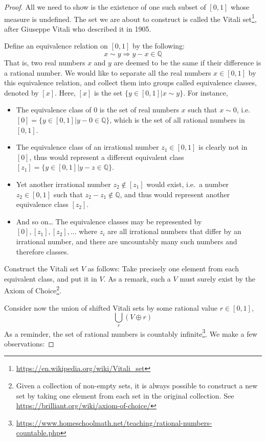 \documentclass[
]{book}
\newcommand{\bbQ}{\mathbb{Q}}
\theoremstyle{definition}
\theoremstyle{definition}
\theoremstyle{definition}
\theoremstyle{definition}
\theoremstyle{remark}
\begin{document}
\begin{proof}
All we need to show is the existence of one such subset of \([0,1]\) whose measure is undefined. The set we are about to construct is called the Vitali set\footnote{\url{https://en.wikipedia.org/wiki/Vitali_set}}, after Giuseppe Vitali who described it in 1905.

Define an equivalence relation on \([0,1]\) by the following:
\[x\sim y \Rightarrow y-x \in \bbQ\]
That is, two real numbers \(x\) and \(y\) are deemed to be the same if their difference is a rational number. We would like to separate all the real numbers \(x\in[0,1]\) by this equivalence relation, and collect them into groups called equivalence classes, denoted by \([x]\). Here, \([x]\) is the set \(\{y \in [0,1] | x \sim y\}.\) For instance,

\begin{itemize}
\item
  The equivalence class of \(0\) is the set of real numbers \(x\) such that \(x \sim 0\), i.e.~\([0] = \{y \in [0,1] | y-0\in\bbQ \}\), which is the set of all rational numbers in \([0,1]\).
\item
  The equivalence class of an irrational number \(z_1\in[0,1]\) is clearly not in \([0]\), thus would represent a different equivalent class \([z_1]=\{y \in [0,1] | y-z \in \bbQ \}\).
\item
  Yet another irrational number \(z_2\not\in [z_1]\) would exist, i.e.~a number \(z_2\in[0,1]\) such that \(z_2-z_1 \not\in\bbQ\), and thus would represent another equivalence class \([z_2]\).
\item
  And so on\ldots{} The equivalence classes may be represented by \([0],[z_1],[z_2],\dots\) where \(z_i\) are all irrational numbers that differ by an irrational number, and there are uncountably many such numbers and therefore classes.
\end{itemize}

Construct the Vitali set \(V\) as follows: Take precisely one element from each equivalent class, and put it in \(V\). As a remark, such a \(V\) must surely exist by the Axiom of Choice\footnote{Given a collection of non-empty sets, it is always possible to construct a new set by taking one element from each set in the original collection. See \url{https://brilliant.org/wiki/axiom-of-choice/}}.

Consider now the union of shifted Vitali sets by some rational value \(r\in[0,1]\),
\[
\bigcup_{r} (V \oplus r)
\]
As a reminder, the set of rational numbers is countably infinite\footnote{\url{https://www.homeschoolmath.net/teaching/rational-numbers-countable.php}}. We make a few observations:


\end{proof}
\end{document}
